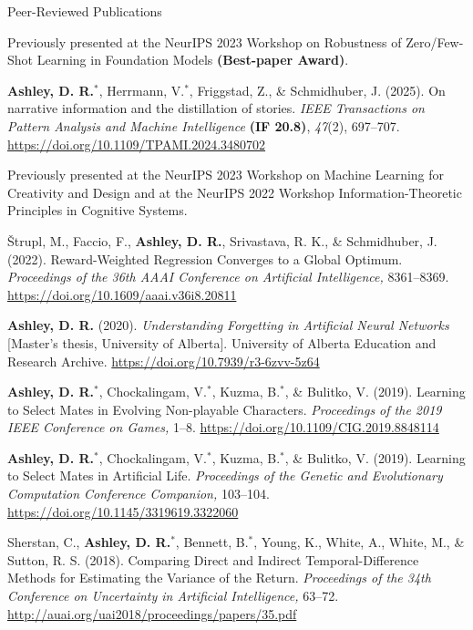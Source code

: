 \documentclass[a4paper,dateabbrev]{cv}
\begin{document}
\begin{rSection}{Peer-Reviewed Publications}
\begin{rPublications}
        \nopagebreak\vspace{-0.4em}\nopagebreak
        Previously presented at the NeurIPS 2023 Workshop on Robustness of Zero/Few-Shot Learning in Foundation Models \textbf{(Best-paper Award)}.
    \item \label{pub:ashley2025distillation}
        \textbf{Ashley, D. R.}$^*$, Herrmann, V.$^*$, Friggstad, Z., \& Schmidhuber, J.
        (2025).
        On narrative information and the distillation of stories.
        \textit{IEEE Transactions on Pattern Analysis and Machine Intelligence} \textbf{(IF 20.8)}, \textit{47}(2), 697--707.
        \url{https://doi.org/10.1109/TPAMI.2024.3480702}

        \nopagebreak\vspace{-0.4em}\nopagebreak
        Previously presented at the NeurIPS 2023 Workshop on Machine Learning for Creativity and Design and at the NeurIPS 2022 Workshop Information-Theoretic Principles in Cognitive Systems.
    \item \label{pub:strupl2021reward}
        {\v{S}}trupl, M., Faccio, F., \textbf{Ashley, D. R.}, Srivastava, R. K., \& Schmidhuber, J.
        (2022).
        Reward-Weighted Regression Converges to a Global Optimum.
        \textit{Proceedings of the 36th AAAI Conference on Artificial Intelligence,} 8361--8369.
        \url{https://doi.org/10.1609/aaai.v36i8.20811}
    \item \label{pub:ashley2020understanding}
        \textbf{Ashley, D. R.}
        (2020).
        \textit{Understanding Forgetting in Artificial Neural Networks} [Master's thesis, University of Alberta].
        University of Alberta Education and Research Archive.
        \url{https://doi.org/10.7939/r3-6zvv-5z64}
    \item \label{pub:ashley2019evolving}
        \textbf{Ashley, D. R.}$^*$, Chockalingam, V.$^*$, Kuzma, B.$^*$, \& Bulitko, V.
        (2019).
        Learning to Select Mates in Evolving Non-playable Characters.
        \textit{Proceedings of the 2019 IEEE Conference on Games,} 1--8.
        \url{https://doi.org/10.1109/CIG.2019.8848114}
    \item \label{pub:ashley2019artificial}
        \textbf{Ashley, D. R.}$^*$, Chockalingam, V.$^*$, Kuzma, B.$^*$, \& Bulitko, V.
        (2019).
        Learning to Select Mates in Artificial Life.
        \textit{Proceedings of the Genetic and Evolutionary Computation Conference Companion,} 103--104.
        \url{https://doi.org/10.1145/3319619.3322060}
    \item \label{pub:sherstan2018comparing}
        Sherstan, C., \textbf{Ashley, D. R.}$^*$, Bennett, B.$^*$, Young, K., White, A., White, M., \& Sutton, R. S.
        (2018).
        Comparing Direct and Indirect Temporal-Difference Methods for Estimating the Variance of the Return.
        \textit{Proceedings of the 34th Conference on Uncertainty in Artificial Intelligence,} 63--72.
        \url{http://auai.org/uai2018/proceedings/papers/35.pdf}


\end{rPublications}
\end{rSection}
\end{document}
